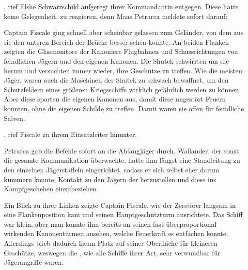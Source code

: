 , rief Elshe Schwarzschild aufgeregt ihrer Kommandantin entgegen. Diese hatte keine Gelegenheit, zu reagieren, denn Maas Petrarca meldete sofort darauf: 

\par

Captain Fiscale ging schnell aber scheinbar gelassen zum Geländer, von dem aus sie den unteren Bereich der Brücke besser sehen konnte. An beiden Flanken zeigten die Glasmonitore der Kanoniere Flugbahnen und Schussrichtungen von feindlichen Jägern und den eigenen Kanonen. Die Shutek schwirrten um die  herum und versuchten immer wieder, ihre Geschütze zu treffen. Wie die meisten Jäger, waren auch die Maschinen der Shutek zu schwach bewaffnet, um den Schutzfeldern eines größeren Kriegsschiffs wirklich gefährlich werden zu können. Aber diese sparten die eigenen Kanonen aus, damit diese ungestört Feuern konnten, ohne die eigenen Schilde zu treffen. Damit waren sie offen für feindliche Salven.

\par

, rief Fiscale zu ihrem Einsatzleiter hinunter. 

\par

Petrarca gab die Befehle sofort an die Abfangjäger durch. Wallander, der sonst die gesamte Kommunikation überwachte, hatte ihm längst eine Standleitung zu den einzelnen Jägerstaffeln eingerichtet, sodass er sich selbst eher darum kümmern konnte, Kontakt zu den Jägern der  herzustellen und diese ins Kampfgeschehen einzubeziehen.

\par

Ein Blick zu ihrer Linken zeigte Captain Fiscale, wie der Zerstörer  langsam in eine Flankenposition kam und seinen Hauptgeschützturm ausrichtete. Das Schiff war klein, aber man konnte ihm bereits an seinen fast überproportional wirkenden Kanonentürmen ansehen, welche Feuerkraft es entfachen konnte. Allerdings blieb dadurch kaum Platz auf seiner Oberfläche für kleineren Geschütze, weswegen die , wie alle Schiffe ihrer Art, sehr verwundbar für Jägerangriffe waren.

\par

